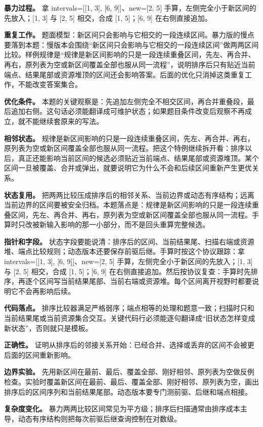 \textbf{暴力过程。} 拿 intervals=[[1, 3], [6, 9]]、new=[2, 5] 手算，左侧完全小于新区间的先放入；[1, 3] 与 [2, 5] 相交，合成 [1, 5]；[6, 9] 在右侧直接追加。

\textbf{重复工作。} 题面模型：新区间只会影响与它相交的一段连续区间。暴力版的慢点要落到本题：慢版本会围绕“新区间只会影响与它相交的一段连续区间”做两两区间比较。样例规律是“规律是新区间影响的只是一段连续重叠区间，先左、再合并、再右，原列表为空或新区间覆盖全部也服从同一流程”，说明排序后只有贴近当前端点、结果尾部或资源堆顶的区间还会影响答案。后面的优化只消掉这类重复工作，不能改变答案集合。

\textbf{优化条件。} 本题的关键观察是：先追加左侧完全不相交区间，再合并重叠段，最后追加右侧。这句话必须能翻译成可维护状态；如果题目条件改变后观察不再成立，就不能继续套原来的写法。

\textbf{相邻状态。} 规律是新区间影响的只是一段连续重叠区间，先左、再合并、再右，原列表为空或新区间覆盖全部也服从同一流程。把这个特例继续拆开看：排序以后，真正还能影响当前区间的候选必须贴近当前端点、结果尾部或资源堆顶。某个区间一旦被覆盖、合并或弹出，就要说明它为什么不会和后续区间重新产生更优关系。

\textbf{状态复用。} 把两两比较压成排序后的相邻关系、当前边界或动态有序结构；远离当前边界的区间要被安全归档。本题落点是：规律是新区间影响的只是一段连续重叠区间，先左、再合并、再右，原列表为空或新区间覆盖全部也服从同一流程。手算时只改被新输入影响的那一小部分，而不是回头重算完整候选。

\textbf{指针和字段。} 状态字段要能说清：排序后的区间、当前结果尾、扫描右端或资源堆、端点比较规则；动态版本还要保存前驱后继。手算时按这个协议跟踪：拿 intervals=[[1, 3], [6, 9]]、new=[2, 5] 手算，左侧完全小于新区间的先放入；[1, 3] 与 [2, 5] 相交，合成 [1, 5]；[6, 9] 在右侧直接追加。然后按协议复查：手算时先排序，再逐个区间写当前结果尾部、当前右端或资源堆。每个区间离开视野时都要说明它不会再影响后续。

\textbf{代码落点。} 排序比较器满足严格弱序；端点相等的处理和题意一致；扫描时只和当前结果尾或当前资源集合交互。关键代码行必须能逐句翻译成“旧状态怎样变成新状态”，否则就只是模板。

\textbf{正确性。} 证明从排序后的邻接关系开始：已经合并、选择或丢弃的区间不会被更后面的区间重新影响。

\textbf{边界实验。} 先用新区间在最前、最后、覆盖全部、刚好相邻、原列表为空做反例检查。实验时覆盖新区间在最前、最后、覆盖全部、刚好相邻、原列表为空，画出排序后的区间序列和当前结果尾部。动态版本要专门测前驱、后继和端点相接。

\textbf{复杂度变化。} 暴力两两比较区间常见为平方级；排序后扫描通常由排序成本主导，动态有序结构则把每次前驱后继查询控制在对数级。

